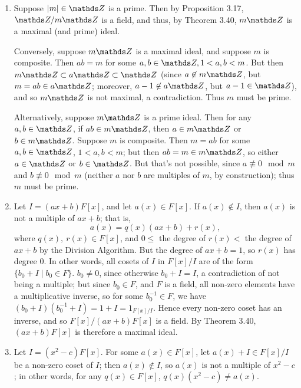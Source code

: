 \documentclass{homework}
\begin{document}
\begin{solution}
  \begin{enumerate}[label=(\alph*)]
    \item Suppose $\left| m \right| \in \Z$ is a prime. Then by Proposition 3.17, $\Z / m\Z$ is a
      field, and thus, by Theorem 3.40, $m\Z$ is a maximal (and prime) ideal.
      
      Conversely, suppose $m\Z$ is a maximal ideal, and suppose $m$ is composite. Then $ab=m$ for some
      $a,b\in \Z, 1<a,b<m$. But then $m\Z \subset a\Z \subset \Z$ (since $a\not\in m\Z$, but
      $m=ab\in a\Z$; moreover, $a-1\not\in a\Z$, but $a-1\in \Z$), and so $m\Z$ is not maximal, a
      contradiction. Thus $m$ must be prime.

      Alternatively, suppose $m\Z$ is a prime ideal. Then for any $a,b\in \Z$, if $ab\in m\Z$, then
      $a\in m\Z$ or $b\in m\Z$. Suppose $m$ is composite. Then $m=ab$ for some $a,b\in \Z$,
      $1<a,b<m$; but then $ab=m\in m\Z$, so either $a\in \Z$ or $b\in \Z$. But that's not possible,
      since $a\not\equiv 0\mod{m}$ and $b\not\equiv 0\mod{m}$ (neither $a$ nor $b$ are multiples of
      $m$, by construction); thus $m$ must be prime.

    \item Let $I=(ax+b)F[x]$, and let $a(x)\in F[x]$. If $a(x)\not\in I$, then $a(x)$ is not a
      multiple of $ax+b$; that is, \[
        a(x)=q(x)(ax+b)+r(x)
      ,\] where $q(x),\ r(x)\in F[x]$, and $0\le $ the degree of $r(x) < $ the degree of $ax+b$ by
      the Division Algorithm. But the degree of $ax+b=1$, so $r(x)$ has degree $0$. In other words,
      all cosets of $I$ in $F[x] / I$ are of the form $\{b_0+I\mid b_0\in F \} $. $b_0\neq 0$, since
      otherwise $b_0+I=I$, a contradiction of not being a multiple; but since $b_0\in F$, and $F$ is
      a field, all non-zero elements have a multiplicative inverse, so for some $b_0^{-1}\in F$, we
      have $(b_0+I)(b_0^{-1}+I)=1+I=1_{F[x] / I}$. Hence every non-zero coset has an inverse, and so
      $F[x] / (ax+b)F[x]$ is a field. By Theorem 3.40, $(ax+b)F[x]$ is therefore a maximal ideal.

    \item Let $I=(x^2-c)F[x]$. For some $a(x)\in F[x]$, let $a(x)+I\in F[x] / I$ be a non-zero coset
      of $I$; then $a(x)\not\in I$, so $a(x)$ is not a multiple of $x^2-c$; in other words, for any
      $q(x)\in F[x]$, $q(x)(x^2-c)\neq a(x)$.


\end{enumerate}
\end{solution}
\end{document}
